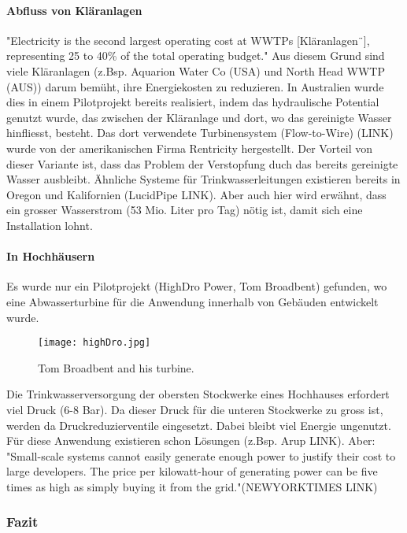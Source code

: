 \paragraph{Abfluss von Kläranlagen}
"Electricity is the second largest operating cost at WWTPs [Kläranlagen¨], representing 25 to 40\% of the total operating budget."
Aus diesem Grund sind viele Kläranlagen (z.Bsp. Aquarion Water Co (USA) und North Head WWTP (AUS)) darum bemüht, ihre Energiekosten zu reduzieren. In Australien wurde dies in einem Pilotprojekt bereits realisiert, indem das hydraulische Potential genutzt wurde, das zwischen der Kläranlage und dort, wo das gereinigte Wasser hinfliesst, besteht. Das dort verwendete Turbinensystem (Flow-to-Wire) (LINK) wurde von der amerikanischen Firma Rentricity hergestellt. Der Vorteil von dieser Variante ist, dass das Problem der Verstopfung duch das bereits gereinigte Wasser ausbleibt.
Ähnliche Systeme für Trinkwasserleitungen existieren bereits in Oregon und Kalifornien (LucidPipe LINK). Aber auch hier wird erwähnt, dass ein grosser Wasserstrom (53 Mio. Liter pro Tag) nötig ist, damit sich eine Installation lohnt.
\paragraph{In Hochhäusern}
Es wurde nur ein Pilotprojekt (HighDro Power, Tom Broadbent) gefunden, wo eine Abwasserturbine für die Anwendung innerhalb von Gebäuden entwickelt wurde.
\begin{figure}
  \texttt{[image: highDro.jpg]}
  \caption{Tom Broadbent and his turbine.}
  \label{fig:turbineTomBroadBent}
\end{figure}
Die Trinkwasserversorgung der obersten Stockwerke eines Hochhauses erfordert viel Druck (6-8 Bar). Da dieser Druck für die unteren Stockwerke zu gross ist, werden da Druckreduzierventile eingesetzt. Dabei bleibt viel Energie ungenutzt. Für diese Anwendung existieren schon Lösungen (z.Bsp. Arup LINK). Aber:
"Small-scale systems cannot easily generate enough power to justify their cost to large developers. The price per kilowatt-hour of generating power can be five times as high as simply buying it from the grid."(NEWYORKTIMES LINK)
\subsubsection{Fazit}
\clearpage 
